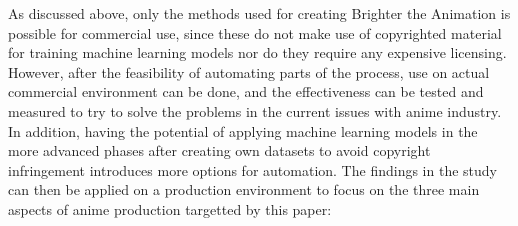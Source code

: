 As discussed above, only the methods used for creating Brighter the Animation is possible for commercial use, since these do not make use of copyrighted material for training machine learning models nor do they require any expensive licensing. However, after the feasibility of automating parts of the process, use on actual commercial environment can be done, and the effectiveness can be tested and measured to try to solve the problems in the current issues with anime industry. In addition, having the potential of applying machine learning models in the more advanced phases after creating own datasets to avoid copyright infringement introduces more options for automation. The findings in the study can then be applied on a production environment to focus on the three main aspects of anime production targetted by this paper:\\
